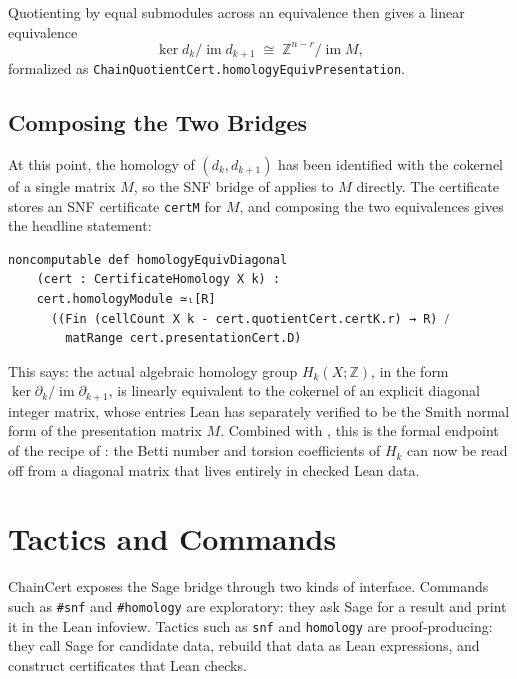 \documentclass[11pt]{article}
\theoremstyle{plain}
\theoremstyle{definition}
\theoremstyle{remark}
\newcommand{\lean}[1]{\lstinline[language=lean]|#1|}
\begin{document}
Quotienting by equal submodules across an equivalence then gives a linear
equivalence
\[
    \ker d_k / \operatorname{im} d_{k+1}
      \;\cong\; \mathbb{Z}^{n - r} / \operatorname{im} M,
\]
formalized as \lean{ChainQuotientCert.homologyEquivPresentation}.

\subsection{Composing the Two Bridges}

At this point, the homology of \((d_k, d_{k+1})\) has been identified with the
cokernel of a single matrix \(M\), so the SNF bridge of
 applies to \(M\) directly. The certificate stores an
SNF certificate \lean{certM} for \(M\), and composing the two equivalences
gives the headline statement:

\begin{lstlisting}[caption={The final homology bridge.},label={lst:homology-diagonal-equivalence}]
noncomputable def homologyEquivDiagonal
    (cert : CertificateHomology X k) :
    cert.homologyModule ≃ₗ[R]
      ((Fin (cellCount X k - cert.quotientCert.certK.r) → R) ⧸
        matRange cert.presentationCert.D)
\end{lstlisting}

This says: the actual algebraic homology group
\(H_k(X;\mathbb{Z})\), in the form \(\ker \partial_k / \operatorname{im}
\partial_{k+1}\), is linearly equivalent to the cokernel of an explicit
diagonal integer matrix, whose entries Lean has separately verified to be the
Smith normal form of the presentation matrix \(M\). Combined with
, this is the formal endpoint of the recipe of
: the Betti number and torsion coefficients of \(H_k\)
can now be read off from a diagonal matrix that lives entirely in checked Lean
data.

\section{Tactics and Commands}\label{sec:tactics}

ChainCert exposes the Sage bridge through two kinds of interface. Commands such
as \lean{#snf} and \lean{#homology} are exploratory: they ask Sage for a result
and print it in the Lean infoview. Tactics such as \lean{snf} and
\lean{homology} are proof-producing: they call Sage for candidate data, rebuild
that data as Lean expressions, and construct certificates that Lean checks.
\end{document}
